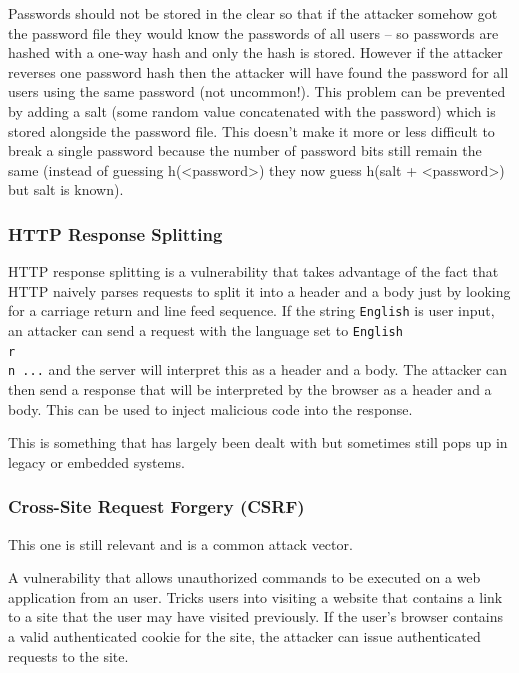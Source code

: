 \documentclass[../notes.tex]{subfiles}
\begin{document}
Passwords should not be stored in the clear so that if the attacker somehow got the password file they would know the passwords of all users -- so passwords are hashed with a one-way hash and only the hash is stored.
However if the attacker reverses one password hash then the attacker will have found the password for all users using the same password (not uncommon!). This problem can be prevented by adding a salt (some random value concatenated with the password) which is stored alongside the password file. This doesn't make it more or less difficult to break a single password because the number of password bits still remain the same (instead of guessing h(<password>) they now guess h(salt + <password>) but salt is known).




\subsubsection{HTTP Response Splitting}


HTTP response splitting is a vulnerability that takes advantage of the fact that HTTP naively parses requests to split it into a header and a body just by looking for a carriage return and line feed sequence. 
If the string \texttt{English} is user input, an attacker can send a request with the language set to \texttt{English\\r\\n  ...} and the server will interpret this as a header and a body. The attacker can then send a response that will be interpreted by the browser as a header and a body. This can be used to inject malicious code into the response.

\begin{blockquote}
    This is something that has largely been dealt with but sometimes still pops up in legacy or embedded systems.
\end{blockquote}





\subsubsection{Cross-Site Request Forgery (CSRF)}

\begin{blockquote}
    This one is still relevant and is a common attack vector.
\end{blockquote}

A vulnerability that allows unauthorized commands to be executed on a web application from an user. Tricks users into visiting a website that contains a link to a site that the user may have visited previously.
If the user's browser contains a valid authenticated cookie for the site, the attacker can issue authenticated requests to the site.
\end{document}
